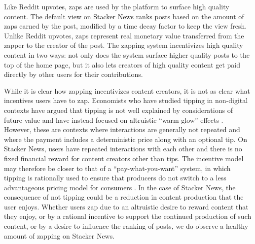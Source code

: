 Like Reddit upvotes, zaps are used by the platform to surface high quality content. The default view on Stacker News ranks posts based on the amount of zaps earned by the post, modified by a time decay factor to keep the view fresh. Unlike Reddit upvotes, zaps represent real monetary value transferred from the zapper to the creator of the post.  The zapping system incentivizes high quality content in two ways: not only does the system surface higher quality posts to the top of the home page, but it also lets creators of high quality content get paid directly by other users for their contributions.

While it is clear how zapping incentivizes content creators, it is not as clear what incentives users have to zap. Economists who have studied tipping in non-digital contexts have argued that tipping is not well explained by considerations of future value \citep{azar2020tipping} and have instead focused on altruistic ``warm glow'' effects \citep{andreoni1990warmglow, crumpler2008warmglow}. However, these are contexts where interactions are generally not repeated and where the payment includes a deterministic price along with an optional tip. On Stacker News, users have repeated interactions with each other and there is no fixed financial reward for content creators other than tips. The incentive model may therefore be closer to that of a ``pay-what-you-want'' system, in which tipping is rationally used to ensure that producers do not switch to a less advantageous pricing model for consumers \citep{mak2015pay}. In the case of Stacker News, the consequence of not tipping could be a reduction in content production that the user enjoys. Whether users zap due to an altruistic desire to reward content that they enjoy, or by a rational incentive to support the continued production of such content, or by a desire to influence the ranking of posts, we do observe a healthy amount of zapping on Stacker News. 


